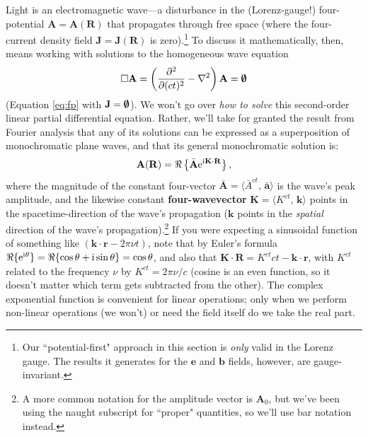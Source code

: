 \documentclass[12pt]{article}
\renewcommand{\vv}[1]{\mathbf{#1}}
\begin{document}
Light is an electromagnetic wave---a disturbance in the (Lorenz-gauge!) four-potential $\vv A = \vv A (\vv R)$ that propagates through free space (where the four-current density field $\vv J = \vv J (\vv R)$ is zero).\footnote{Our ``potential-first" approach in this section is \emph{only} valid in the Lorenz gauge. The results it generates for the $\vv e$ and $\vv b$ fields, however, are gauge-invariant.} To discuss it mathematically, then, means working with solutions to the homogeneous wave equation
\begin{equation*}
\Box \vv A =  \left(\dfrac{\partial^2}{\partial (ct)^2} - \nabla ^2 \right) \vv A = \textrm{\mbox{\boldmath $\emptyset$}}
\end{equation*}
(Equation \ref{eq:fp} with $\vv J = \textrm{\mbox{\boldmath$\emptyset$}}$). We won't go over \emph{how to solve} this second-order linear partial differential equation. Rather, we'll take for granted the result from Fourier analysis that any of its solutions can be expressed as a superposition of monochromatic plane waves, and that its general monochromatic solution is:
\begin{equation}\label{eq:pw}
\vv A (\vv R) = \Re \left \lbrace \bar{\vv A} \mathrm{e}^{\mathrm{i} \mkern.5mu \vv K \cdot \vv R} \right \rbrace ,
\end{equation}
where the magnitude of the constant four-vector $\bar{\vv A} = \langle \bar{A}^{ct}, \, \bar{\vv a} \rangle$ is the wave's peak amplitude, and the likewise constant \textbf{four-wavevector} ${\vv K = \langle K^{ct}, \, \vv k \rangle}$ points in the spacetime-direction of the wave's propagation ($\vv k$ points in the \emph{spatial} direction of the wave's propagation).\footnote{A more common notation for the amplitude vector is $\vv A_0$, but we've been using the naught subscript for ``proper" quantities, so we'll use bar notation instead.} If you were expecting a sinusoidal function of something like $(\vv k \cdot \vv r - 2 \pi \nu t )$, note that by Euler's formula ${\Re \lbrace \mathrm{e}^{\mathrm{i} \mkern.5mu \theta} \rbrace = \Re \lbrace \cos \theta + \mathrm{i} \sin \theta \rbrace = \cos \theta}$, and also that $\vv K \cdot \vv R = K^{ct}ct - \vv k \cdot \vv r$, with $K^{ct}$ related to the frequency $\nu$ by $K^{ct} = 2 \pi \nu / c$ (cosine is an even function, so it doesn't matter which term gets subtracted from the other). The complex exponential function is convenient for linear operations; only when we perform non-linear operations (we won't) or need the field itself do we take the real part.
\end{document}
